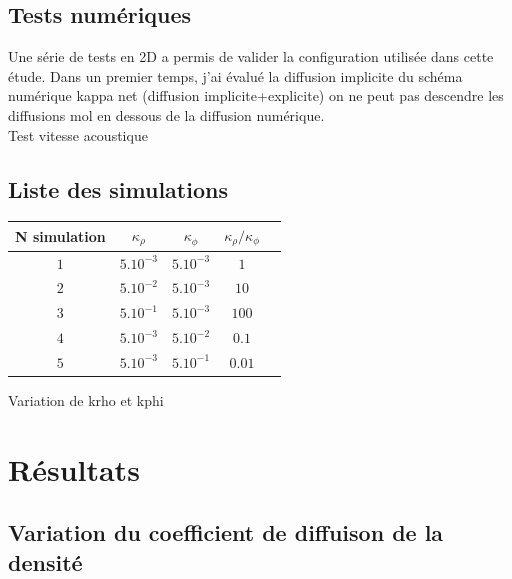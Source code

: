 \documentclass[a4paper,12pt]{article}
\begin{document}
    \subsection{Tests numériques}
    
    Une série de tests en 2D a permis de valider la configuration utilisée dans cette étude. Dans un premier temps, j'ai évalué la diffusion implicite du schéma numérique 
    kappa net (diffusion implicite+explicite) on ne peut pas descendre les diffusions mol en dessous de la diffusion numérique. \\
    Test vitesse acoustique \\
   
    \subsection{Liste des simulations}
    
    \begin{center}
    \begin{tabular}{|c|c|c|c|c|}
    \hline
         N simulation & $\kappa_{\rho}$ & $\kappa_{\phi}$ & $\kappa_{\rho}/\kappa_{\phi}$ \\ \hline
         $1$ & $5.10^{-3}$ & $5.10^{-3}$ & $1$\\
         \hline
         $2$ & $5.10^{-2}$ & $5.10^{-3}$ & $10$ \\
         \hline
         $3$ & $5.10^{-1}$ & $5.10^{-3}$ & $100$\\
         \hline
         $4$ & $5.10^{-3}$ & $5.10^{-2}$ & $0.1$\\
         \hline
         $5$ & $5.10^{-3}$ & $5.10^{-1}$ & $0.01$\\
         \hline
    \end{tabular}
    \end{center}
    Variation de krho et kphi


\newpage
\section{Résultats}

  \subsection{Variation du coefficient de diffuison de la densité}
  
\end{document}
